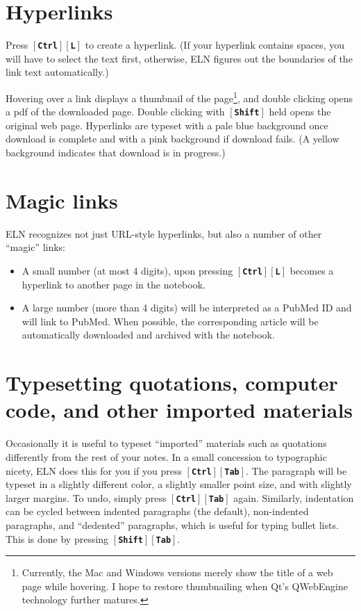 \documentclass[11pt]{report}
\def\keystroke#1{$\left[\right.\!${\tt\bfseries #1}$\!\left.\right]$}
\def\key#1{\keystroke{#1}}
\def\keycombo#1#2{\keystroke{#1}\keystroke{#2}}
\def\keycontrol#1{\keycombo{Ctrl}{#1}}
\def\keyshift#1{\keycombo{Shift}{#1}}
\begin{document}
\section{Hyperlinks}

Press \keycontrol{L} to create a hyperlink. (If your hyperlink
contains spaces, you will have to select the text first, otherwise,
ELN figures out the boundaries of the link text automatically.)

Hovering over a link displays a thumbnail of the
page\footnote{Currently, the Mac and Windows versions merely show the
  title of a web page while hovering. I hope to restore thumbnailing
  when Qt's QWebEngine technology further matures.}, and double
clicking opens a pdf of the downloaded page. Double clicking with
\key{Shift} held opens the original web page. Hyperlinks are typeset
with a pale blue background once download is complete and with a pink
background if download fails. (A yellow background indicates that
download is in progress.)

\section{Magic links}

ELN recognizes not just URL-style hyperlinks, but also a number of
other ``magic'' links:
\begin{itemize}
\item A small number (at most 4 digits), upon pressing \keycontrol{L}
becomes a hyperlink to another page in the notebook.
\item A large number (more than 4 digits)
will be interpreted as a PubMed ID and will link to PubMed. When
possible, the corresponding article will be automatically downloaded
and archived with the notebook. 
\end{itemize}

\section{Typesetting quotations, computer code, and other imported materials}

Occasionally it is useful to typeset ``imported'' materials such as
quotations differently from the rest of your notes. In a small
concession to typographic nicety, ELN does this for you if you press
\keycontrol{Tab}.  The paragraph will be typeset in a slightly
different color, a slightly smaller point size, and with slightly
larger margins. To undo, simply press \keycontrol{Tab}
again. Similarly, indentation can be cycled between indented
paragraphs (the default), non-indented paragraphs, and ``dedented''
paragraphs, which is useful for typing bullet lists. This is done by
pressing \keyshift{Tab}.
\end{document}
